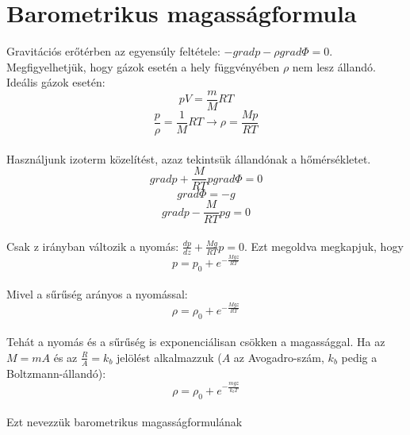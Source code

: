 \documentclass[a4paper]{article}
\begin{document}
\section{Barometrikus magasságformula}

Gravitációs erőtérben az egyensúly feltétele: $-gradp-\rho grad\Phi=0$. Megfigyelhetjük, hogy gázok esetén a hely függvényében $\rho$ nem lesz állandó. Ideális gázok esetén:
\begin{equation}
pV=\frac{m}{M}RT
\end{equation}
\begin{equation}
\frac{p}{\rho}=\frac{1}{M}RT\rightarrow \rho=\frac{Mp}{RT}
\end{equation}
\\
Használjunk izoterm közelítést, azaz tekintsük állandónak a hőmérsékletet.
\\
\begin{equation}
gradp+\frac{M}{RT}pgrad\Phi=0
\end{equation}
\begin{equation}
grad\Phi=-g
\end{equation}
\begin{equation}
gradp-\frac{M}{RT}pg=0
\end{equation}
\\
Csak z irányban változik a nyomás: $\frac{dp}{dz}+\frac{Mg}{RT}p=0$. Ezt megoldva megkapjuk, hogy
\begin{equation}
p=p_0+e^{-\frac{Mgz}{RT}}
\end{equation}
\\
Mivel a sűrűség arányos a nyomással:
\begin{equation}
\rho=\rho_0+e^{-\frac{Mgz}{RT}}
\end{equation}
\\
Tehát a nyomás és a sűrűség is exponenciálisan csökken a magassággal. Ha az $M=mA$ és az $\frac{R}{A}=k_b$ jelölést alkalmazzuk ($A$ az Avogadro-szám, $k_b$ pedig a Boltzmann-állandó):
\begin{equation}
\rho=\rho_0+e^{-\frac{mgz}{k_bT}}
\end{equation}
\\
Ezt nevezzük barometrikus magasságformulának
\end{document}
